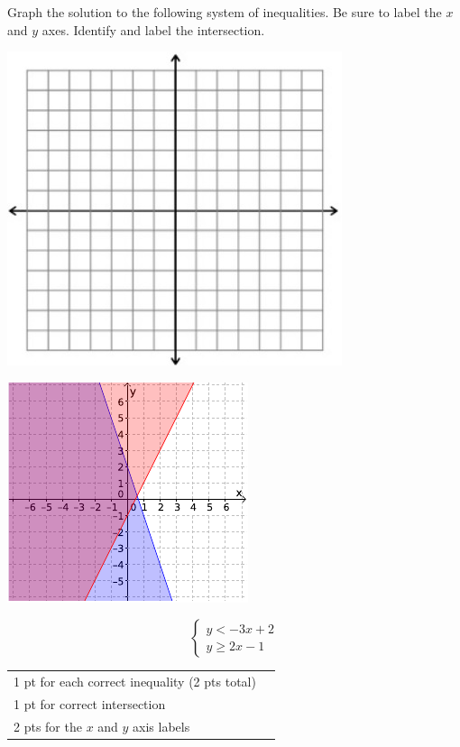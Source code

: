 {
	Graph the solution to the following system of inequalities. Be sure to label the $x$ and $y$ axes. Identify and label the intersection. \begin{onlyproblem}\begin{center}\includegraphics{fig-graphpaper.png}\end{center}\end{onlyproblem} \begin{onlysolution}\begin{center}\includegraphics{fig095-12-a-answer}\end{center}\end{onlysolution}
	$$\begin{cases}y<-3x+2\\ y\geq 2x-1 \end{cases}$$
}
{
	\begin{tabular}{l r}
	1 pt for each correct inequality (2 pts total)\\
	1 pt for correct intersection\\
	2 pts for the $x$ and $y$ axis labels\\
	\end{tabular}
}

